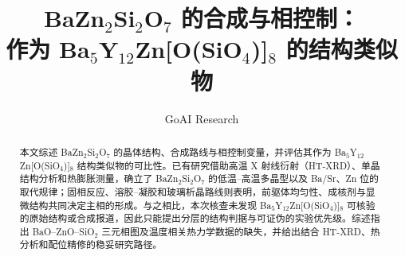 \documentclass[10pt,linespread=1.5]{ctexart}
\title{BaZn$_2$Si$_2$O$_7$ 的合成与相控制：\texorpdfstring{\\}{ }作为 Ba$_5$Y$_{12}$Zn[O(SiO$_4$)]$_8$ 的结构类似物}
\author{GoAI Research}
\date{}
\begin{document}
\maketitle

\begin{abstract}
本文综述 BaZn$_2$Si$_2$O$_7$ 的晶体结构、合成路线与相控制变量，并评估其作为 Ba$_5$Y$_{12}$Zn[O(SiO$_4$)]$_8$ 结构类似物的可比性。已有研究借助高温 X 射线衍射（HT\nobreakdash-XRD）、单晶结构分析和热膨胀测量，确立了 BaZn$_2$Si$_2$O$_7$ 的低温--高温多晶型以及 Ba\slash Sr、Zn 位的取代规律；固相反应、溶胶--凝胶和玻璃析晶路线则表明，前驱体均匀性、成核剂与显微结构共同决定主相的形成。与之相比，本次核查未发现 Ba$_5$Y$_{12}$Zn[O(SiO$_4$)]$_8$ 可核验的原始结构或合成报道，因此只能提出分层的结构判据与可证伪的实验优先级。综述指出 BaO--ZnO--SiO$_2$ 三元相图及温度相关热力学数据的缺失，并给出结合 HT\nobreakdash-XRD、热分析和配位精修的稳妥研究路径。
\end{abstract}











\end{document}
